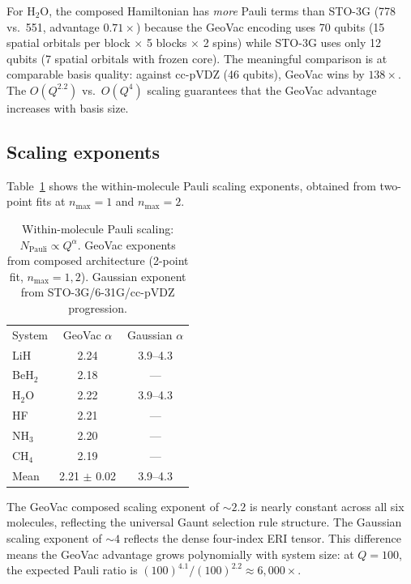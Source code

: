 \documentclass[twocolumn,pra,amsmath,amssymb,superscriptaddress]{revtex4-2}
\begin{document}
For H$_2$O, the composed Hamiltonian has \emph{more} Pauli terms than
STO-3G (778 vs.\ 551, advantage $0.71\times$) because the GeoVac
encoding uses 70 qubits (15 spatial orbitals per block $\times$ 5 blocks
$\times$ 2 spins) while STO-3G uses only 12 qubits (7 spatial orbitals
with frozen core).  The meaningful comparison is at comparable basis
quality: against cc-pVDZ (46 qubits), GeoVac wins by $138\times$.
The $O(Q^{2.2})$ vs.\ $O(Q^4)$ scaling guarantees that the GeoVac
advantage increases with basis size.

\subsection{Scaling exponents}

Table~\ref{tab:scaling} shows the within-molecule Pauli scaling exponents,
obtained from two-point fits at $n_{\max}=1$ and $n_{\max}=2$.

\begin{table}[h]
\caption{Within-molecule Pauli scaling: $N_{\text{Pauli}} \propto Q^{\alpha}$.
  GeoVac exponents from composed architecture (2-point fit,
  $n_{\max}=1,2$).  Gaussian exponent from STO-3G/6-31G/cc-pVDZ
  progression.}
\label{tab:scaling}
\begin{ruledtabular}
\begin{tabular}{lcc}
System & GeoVac $\alpha$ & Gaussian $\alpha$ \\
\colrule
LiH    & 2.24 & 3.9--4.3 \\
BeH$_2$ & 2.18 & --- \\
H$_2$O  & 2.22 & 3.9--4.3 \\
HF     & 2.21 & --- \\
NH$_3$  & 2.20 & --- \\
CH$_4$  & 2.19 & --- \\
\colrule
Mean   & 2.21 $\pm$ 0.02 & 3.9--4.3 \\
\end{tabular}
\end{ruledtabular}
\end{table}

The GeoVac composed scaling exponent of $\sim 2.2$ is nearly constant
across all six molecules, reflecting the universal Gaunt selection rule
structure.  The Gaussian scaling exponent of $\sim 4$ reflects the
dense four-index ERI tensor.  This difference means the GeoVac
advantage grows polynomially with system size: at $Q=100$, the
expected Pauli ratio is $(100)^{4.1}/(100)^{2.2} \approx 6{,}000\times$.
\end{document}
